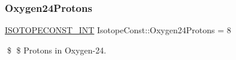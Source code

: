 \subsubsection{\texorpdfstring{Oxygen24\+Protons}{Oxygen24Protons}}
{\footnotesize\ttfamily \mbox{\hyperlink{group___isotope_const-_macros_ga5f18360b3e99483a35c32d789e62621c}{I\+S\+O\+T\+O\+P\+E\+C\+O\+N\+S\+T\+\_\+\+I\+NT}} Isotope\+Const\+::\+Oxygen24\+Protons = 8}

\$ \$ Protons in Oxygen-\/24. 
